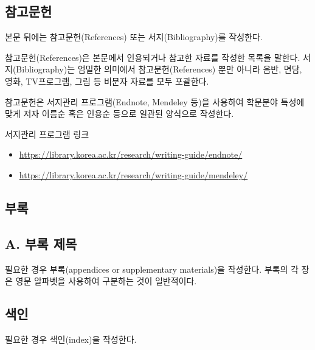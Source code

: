 \documentclass[11pt]{report}
\numberwithin{figure}{section}
\theoremstyle{plain}
\theoremstyle{definition}
\theoremstyle{corollary}
\theoremstyle{definition}
\theoremstyle{plain}
\theoremstyle{definition}
\theoremstyle{plain}
\begin{document}
\begin{center}
\chapter*{참고문헌} %
\end{center}

\normalsize
본문 뒤에는 참고문헌(References) 또는 서지(Bibliography)를 작성한다.\par
참고문헌(References)은 본문에서 인용되거나 참고한 자료를 작성한 목록을 말한다. 서지(Bibliography)는 엄밀한 의미에서 참고문헌(References) 뿐만 아니라 음반, 면담, 영화, TV프로그램, 그림 등 비문자 자료를 모두 포괄한다. \par
참고문헌은 서지관리 프로그램(Endnote, Mendeley 등)을 사용하여 학문분야 특성에 맞게 저자 이름순 혹은 인용순 등으로 일관된 양식으로 작성한다.


\bigskip

서지관리 프로그램 링크
\begin{itemize}
\item\url{https://library.korea.ac.kr/research/writing-guide/endnote/}
\item\url{https://library.korea.ac.kr/research/writing-guide/mendeley/}
\end{itemize}

\begin{center}
\chapter*{부록} %
\end{center}

\normalsize
{} 
\section*{A. 부록 제목} %
필요한 경우 부록(appendices or supplementary materials)을 작성한다.
부록의 각 장은 영문 알파벳을 사용하여 구분하는 것이 일반적이다.

\begin{center}
\chapter*{색인}

\end{center}
\normalsize
필요한 경우 색인(index)을 작성한다.
\end{document}
